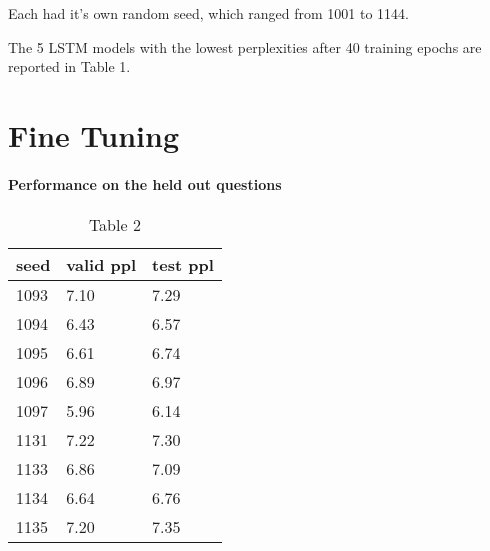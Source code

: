 \documentclass{article}
\begin{document}
Each had it's own random seed, which ranged from 1001 to 1144. 

The 5 LSTM models with the lowest perplexities after 40 training epochs are reported in Table 1. 

\begin{table}[]
\centering
{}
    \caption{Table 1}
\label{tab:Table-1}
\end{table}

\section{Fine Tuning}


\paragraph{Performance on the held out questions}
\begin{table}[]
\begin{tabular}{@{}lll@{}}
\toprule
seed & valid ppl & test ppl \\ \midrule
1093 & 7.10      & 7.29     \\  
1094 & 6.43      & 6.57     \\  
1095 & 6.61      & 6.74     \\  
1096 & 6.89      & 6.97     \\  
1097 & 5.96      & 6.14     \\  
1131 & 7.22      & 7.30     \\  
1133 & 6.86      & 7.09     \\  
1134 & 6.64      & 6.76     \\  
1135 & 7.20      & 7.35     \\ \bottomrule
\end{tabular}
    \caption{Table 2}
\label{tab:Table-2}
\end{table}
\end{document}

